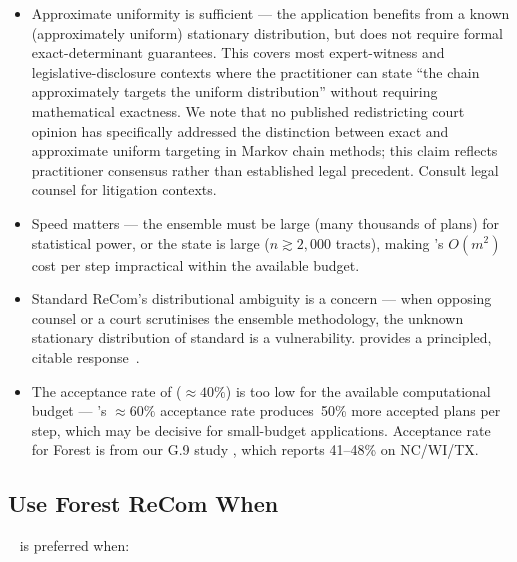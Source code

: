 \begin{itemize}
  \item Approximate uniformity is sufficient --- the application benefits
        from a known (approximately uniform) stationary distribution, but
        does not require formal exact-determinant guarantees.
        This covers most expert-witness and legislative-disclosure contexts
        where the practitioner can state ``the chain approximately targets
        the uniform distribution'' without requiring mathematical exactness.
        We note that no published redistricting court opinion has
        specifically addressed the distinction between exact and approximate
        uniform targeting in Markov chain methods; this claim reflects
        practitioner consensus rather than established legal precedent.
        Consult legal counsel for litigation contexts.

  \item Speed matters --- the ensemble must be large (many thousands of
        plans) for statistical power, or the state is large ($n \gtrsim
        2{,}000$ tracts), making \forestrecom{}'s $O(m^2)$ cost per step
        impractical within the available budget.

  \item Standard ReCom's distributional ambiguity is a concern --- when
        opposing counsel or a court scrutinises the ensemble methodology,
        the unknown stationary distribution of standard \recom{} is a
        vulnerability.
        \mergesplit{} provides a principled, citable response~\citep{janson2022}.

  \item The acceptance rate of \forestrecom{} ($\approx\!40\%$) is too
        low for the available computational budget --- \mergesplit{}'s
        $\approx\!60\%$ acceptance rate produces~50\% more accepted plans
        per step, which may be decisive for small-budget applications.
        Acceptance rate for Forest \recom{} is from our G.9 study
        \citep{dellaLibera2026forestRecom}, which reports 41--48\% on
        NC/WI/TX.
\end{itemize}

\subsection{Use Forest ReCom When}

\forestrecom{}~\citep{dellaLibera2026forestRecom} is preferred when:

